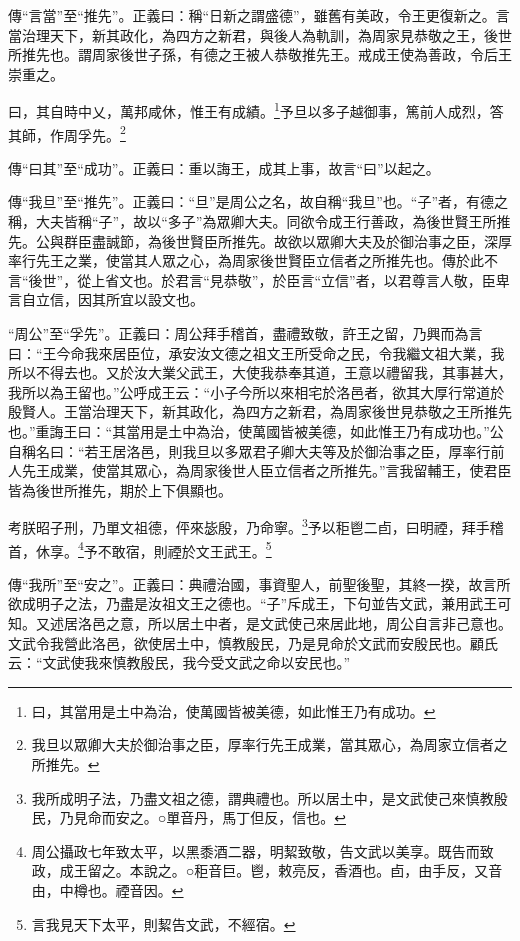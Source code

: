 {\noindent\zhuan{}\fzbyks 傳“言當”至“推先”。正義曰：稱“日新之謂盛德”，雖舊有美政，令王更復新之。言當治理天下，新其政化，為四方之新君，與後人為軌訓，為周家見恭敬之王，後世所推先也。謂周家後世子孫，有德之王被人恭敬推先王。戒成王使為善政，令后王崇重之。 \par}

曰，其自時中乂，萬邦咸休，惟王有成績。\footnote{曰，其當用是土中為治，使萬國皆被美德，如此惟王乃有成功。}予旦以多子越御事，篤前人成烈，答其師，作周孚先。\footnote{我旦以眾卿大夫於御治事之臣，厚率行先王成業，當其眾心，為周家立信者之所推先。}

{\noindent\zhuan{}\fzbyks 傳“曰其”至“成功”。正義曰：重以誨王，成其上事，故言“曰”以起之。 \par}

{\noindent\zhuan{}\fzbyks 傳“我旦”至“推先”。正義曰：“旦”是周公之名，故自稱“我旦”也。“子”者，有德之稱，大夫皆稱“子”，故以“多子”為眾卿大夫。同欲令成王行善政，為後世賢王所推先。公與群臣盡誠節，為後世賢臣所推先。故欲以眾卿大夫及於御治事之臣，深厚率行先王之業，使當其人眾之心，為周家後世賢臣立信者之所推先也。傳於此不言“後世”，從上省文也。於君言“見恭敬”，於臣言“立信”者，以君尊言人敬，臣卑言自立信，因其所宜以設文也。 \par}

{\noindent\shu{}\fzkt “周公”至“孚先”。正義曰：周公拜手稽首，盡禮致敬，許王之留，乃興而為言曰：“王今命我來居臣位，承安汝文德之祖文王所受命之民，令我繼文祖大業，我所以不得去也。又於汝大業父武王，大使我恭奉其道，王意以禮留我，其事甚大，我所以為王留也。”公呼成王云：“小子今所以來相宅於洛邑者，欲其大厚行常道於殷賢人。王當治理天下，新其政化，為四方之新君，為周家後世見恭敬之王所推先也。”重誨王曰：“其當用是土中為治，使萬國皆被美德，如此惟王乃有成功也。”公自稱名曰：“若王居洛邑，則我旦以多眾君子卿大夫等及於御治事之臣，厚率行前人先王成業，使當其眾心，為周家後世人臣立信者之所推先。”言我留輔王，使君臣皆為後世所推先，期於上下俱顯也。 \par}

考朕昭子刑，乃單文祖德，伻來毖殷，乃命寧。\footnote{我所成明子法，乃盡文祖之德，謂典禮也。所以居土中，是文武使己來慎教殷民，乃見命而安之。○單音丹，馬丁但反，信也。}予以秬鬯二卣，曰明禋，拜手稽首，休享。\footnote{周公攝政七年致太平，以黑黍酒二器，明絜致敬，告文武以美享。既告而致政，成王留之。本說之。○秬音巨。鬯，敕亮反，香酒也。卣，由手反，又音由，中樽也。禋音因。}予不敢宿，則禋於文王武王。\footnote{言我見天下太平，則絜告文武，不經宿。}


{\noindent\zhuan{}\fzbyks 傳“我所”至“安之”。正義曰：典禮治國，事資聖人，前聖後聖，其終一揆，故言所欲成明子之法，乃盡是汝祖文王之德也。“子”斥成王，下句並告文武，兼用武王可知。又述居洛邑之意，所以居土中者，是文武使己來居此地，周公自言非己意也。文武令我營此洛邑，欲使居土中，慎教殷民，乃是見命於文武而安殷民也。顧氏云：“文武使我來慎教殷民，我今受文武之命以安民也。” \par}

